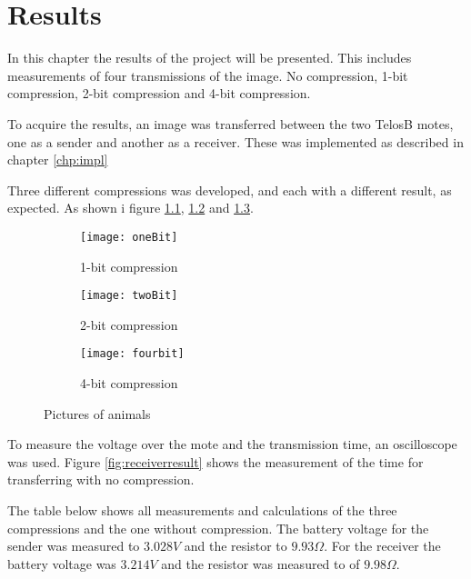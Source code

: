 \chapter{Results}
\label{chp:results}

In this chapter the results of the project will be presented. This includes measurements of four transmissions of the image. No compression, 1-bit compression, 2-bit compression and 4-bit compression.

To acquire the results, an image was transferred between the two TelosB motes, one as a sender and another as a receiver. These was implemented as described in chapter \ref{chp:impl}

Three different compressions was developed, and each with a different result, as expected. As shown i figure \ref{fig:one}, \ref{fig:two} and \ref{fig:four}.

\begin{figure}[h]
	\centering
	\begin{subfigure}{0.3\textwidth}
		\texttt{[image: oneBit]}
		\caption{1-bit compression}
		\label{fig:one}
	\end{subfigure}
	\begin{subfigure}{0.3\textwidth}
		\texttt{[image: twoBit]}
		\caption{2-bit compression}
		\label{fig:two}
	\end{subfigure}
	\begin{subfigure}{0.3\textwidth}
		\texttt{[image: fourbit]}
		\caption{4-bit compression}
		\label{fig:four}
	\end{subfigure}
	\caption{Pictures of animals}\label{fig:animals}
\end{figure}


To measure the voltage over the mote and the transmission time, an oscilloscope was used. Figure \ref{fig:receiverresult} shows the measurement of the time for transferring with no compression. 



The table below shows all measurements and calculations of the three compressions and the one without compression. The battery voltage for the sender was measured to $3.028V$ and the resistor to $9.93\Omega$. For the receiver the battery voltage was $3.214V$ and the resistor was measured to of $9.98\Omega$.

